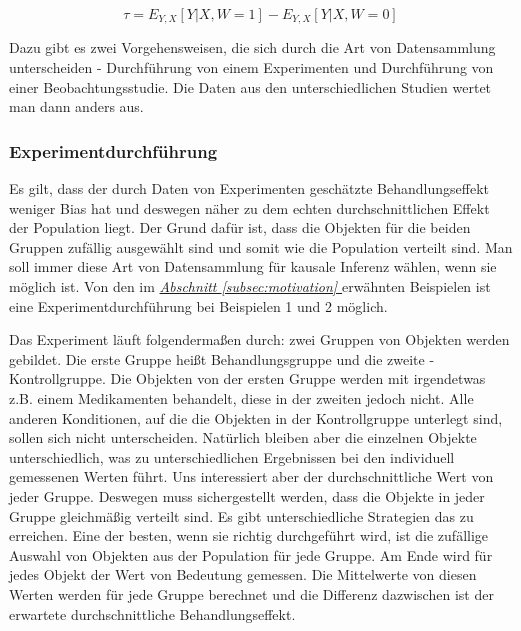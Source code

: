 \documentclass[12pt,a4paper,twoside]{scrartcl}
\numberwithin{equation}{section}
\newcommand{\refsec}[1]{\emph{\hyperref[#1]{Abschnitt \ref*{#1} }}}
\begin{document}
\begin{equation}\label{eq:1.4}
  \tau = E_{Y,X}[Y|X,W = 1] - E_{Y,X}[Y|X,W = 0]
\end{equation}  

\noindent
Dazu gibt es zwei Vorgehensweisen, die sich durch die Art von Datensammlung unterscheiden - Durchführung von einem Experimenten und Durchführung von einer Beobachtungsstudie. Die Daten aus den unterschiedlichen Studien wertet man dann anders aus.\par

\subsubsection{Experimentdurchführung}\label{subsubsec:experimentdurchführung}

Es gilt, dass der durch Daten von Experimenten geschätzte Behandlungseffekt weniger Bias hat und deswegen näher zu dem echten durchschnittlichen Effekt der Population  liegt. Der Grund dafür ist, dass die Objekten für die beiden Gruppen zufällig ausgewählt sind und somit wie die Population verteilt sind\cite{rubin1974estimating}. Man soll immer diese Art von Datensammlung für kausale Inferenz wählen, wenn sie möglich ist. Von den im \refsec{subsec:motivation} erwähnten Beispielen ist eine Experimentdurchführung bei Beispielen 1 und 2 möglich. 

\clearpage
\noindent
Das Experiment läuft folgendermaßen durch: zwei Gruppen von Objekten  werden gebildet. Die erste Gruppe heißt Behandlungsgruppe und die zweite  - Kontrollgruppe. Die Objekten von der ersten Gruppe werden mit irgendetwas z.B. einem Medikamenten behandelt, diese in der zweiten jedoch nicht. Alle anderen Konditionen, auf die die Objekten in der Kontrollgruppe unterlegt sind, sollen sich nicht unterscheiden. Natürlich bleiben aber die einzelnen Objekte unterschiedlich, was zu unterschiedlichen Ergebnissen bei den individuell gemessenen Werten  führt. Uns interessiert aber der durchschnittliche Wert von jeder Gruppe. Deswegen muss sichergestellt werden, dass die Objekte in jeder Gruppe gleichmäßig verteilt sind. Es gibt unterschiedliche Strategien das zu erreichen. Eine der besten, wenn sie richtig durchgeführt wird, ist die zufällige Auswahl von Objekten aus der Population für jede Gruppe. Am Ende wird für jedes Objekt der Wert von Bedeutung gemessen. Die Mittelwerte von diesen Werten werden für jede Gruppe berechnet und die Differenz dazwischen ist der erwartete durchschnittliche Behandlungseffekt.  
\par
\end{document}
